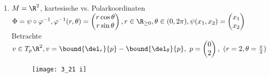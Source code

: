 \begin{exmp}
	\begin{enumerate}[label={\roman*})]
		\item $ M = \R^2 $, kartesische vs. Polarkoordinaten\\
			$ \Phi = \psi \circ \varphi^{-1}, \varphi^{-1}(r,\theta) = \begin{pmatrix}
				r \cos \theta \\ r \sin \theta
			\end{pmatrix}, r \in \R_{\geq 0}, \theta \in (0,2\pi), \psi(x_1,x_2) = \begin{pmatrix}
			x_1\\x_2
			\end{pmatrix} $\\
			Betrachte $v \in T_p\R^2, v = \bound{\del_r}{p} - \bound{\del_\theta}{p},\ p = \begin{pmatrix}
				0\\2
			\end{pmatrix},\ (r=2,\theta = \frac{\pi}{2})$\\
			\begin{minipage}{\linewidth}
				\begin{wrapfigure}{R}{4cm}
					\centering
					\texttt{[image: 3\_21 i]}
				\end{wrapfigure}
				

\end{minipage}
\end{enumerate}
\end{exmp}
